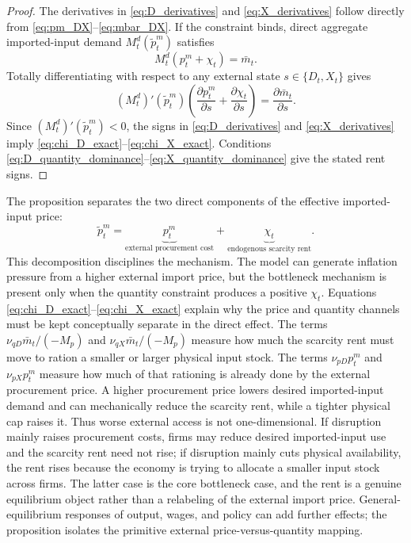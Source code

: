 ﻿\documentclass[12pt]{article}
\theoremstyle{remark}
\begin{document}
\begin{proof}
The derivatives in \eqref{eq:D_derivatives} and \eqref{eq:X_derivatives} follow directly from
\eqref{eq:pm_DX}--\eqref{eq:mbar_DX}. If the constraint binds, direct aggregate imported-input demand
$M_t^d(\tilde p_t^m)$ satisfies
\begin{equation}
    M_t^d(p_t^m+\chi_t)=\bar m_t.
    \label{eq:binding_m_market}
\end{equation}
Totally differentiating with respect to any external state $s\in\{D_t,X_t\}$ gives
\begin{equation}
    (M_t^d)'(\tilde p_t^m)
    \left(
        \frac{\partial p_t^m}{\partial s}
        +
        \frac{\partial\chi_t}{\partial s}
    \right)
    =
    \frac{\partial \bar m_t}{\partial s}.
    \label{eq:chi_DX_derivative_proof}
\end{equation}
Since $(M_t^d)'(\tilde p_t^m)<0$, the signs in
\eqref{eq:D_derivatives} and \eqref{eq:X_derivatives} imply
\eqref{eq:chi_D_exact}--\eqref{eq:chi_X_exact}. Conditions
\eqref{eq:D_quantity_dominance}--\eqref{eq:X_quantity_dominance} give the stated rent signs.
\end{proof}

The proposition separates the two direct components of the effective imported-input price:
\begin{equation}
    \tilde p_t^m
    =
    \underbrace{p_t^m}_{\text{external procurement cost}}
    +
    \underbrace{\chi_t}_{\text{endogenous scarcity rent}}.
    \label{eq:effective_price_decomp}
\end{equation}
This decomposition disciplines the mechanism. The model can generate inflation pressure from a
higher external import price, but the bottleneck mechanism is present only when the quantity
constraint produces a positive $\chi_t$. Equations
\eqref{eq:chi_D_exact}--\eqref{eq:chi_X_exact} explain why the price and quantity channels must be
kept conceptually separate in the direct effect. The terms
$\nu_{qD}\bar m_t/(-M_p)$ and $\nu_{qX}\bar m_t/(-M_p)$ measure how much the scarcity rent must move
to ration a smaller or larger physical input stock. The terms $\nu_{pD}p_t^m$ and
$\nu_{pX}p_t^m$ measure how much of that rationing is already done by the external procurement
price. A higher procurement price lowers desired imported-input demand and can mechanically reduce
the scarcity rent, while a tighter physical cap raises it. Thus worse external access is not
one-dimensional. If disruption mainly raises procurement costs, firms may reduce desired
imported-input use and the scarcity rent need not rise; if disruption mainly cuts physical
availability, the rent rises because the economy is trying to allocate a smaller input stock across
firms. The latter case is the core bottleneck case, and the rent is a genuine equilibrium object
rather than a relabeling of the external import price. General-equilibrium responses of output,
wages, and policy can add further effects; the proposition isolates the primitive external
price-versus-quantity mapping.
\end{document}
